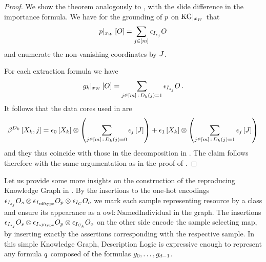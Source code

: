 \begin{proof}
    We show the theorem analogously to , with the slide difference in the importance formula.
    We have for the grounding of $p$ on $\mathrm{KG}|_{x_{W}}$ that
    \begin{align*}
        {p}|_{x_{W}}\left[O\right] = \sum_{j\in[m]}  \epsilon_{I_{s_j}}{O}
    \end{align*}
    and enumerate the non-vanishing coordinates by $J$.

    For each extraction formula we have
    \begin{align*}
        {g_{k}}|_{x_{W}}\left[O\right] = \sum_{j\in[m] \,:\, D_{k}(j)=1} \epsilon_{I_{s_j}}{O} \,.
    \end{align*}
    It follows that the data cores used in  are
    \begin{align*}
        \beta^{D_k}\left[X_{k},j\right]
        = \epsilon_{0}\left[X_{k}\right] \otimes \left(\sum_{j\in[m] \, : \, D_{k}(j)=0} \epsilon_{j}\left[J\right]\right)
        +\epsilon_{1}\left[X_{k}\right] \otimes \left(\sum_{j\in[m] \, : \, D_{k}(j)=1} \epsilon_{j}\left[J\right]\right)
    \end{align*}
    and they thus coincide with those in the decomposition in .
    The claim follows therefore with the same argumentation as in the proof of .
\end{proof}

%
Let us provide some more insights on the construction of the reproducing Knowledge Graph in .
By the insertions to the one-hot encodings $\epsilon_{I_{s_j}}{O_{s}} \otimes \epsilon_{I_{\mathrm{rdf}\mathrm{type}}}{O_{p}} \otimes \epsilon_{I_{C}}{O_{o}}$ we mark each sample representing resource by a class and ensure its appearance as a $\mathrm{owl:NamedIndividual}$ in the graph.
The insertions $\epsilon_{I_{s_j}}{O_{s}}\otimes \epsilon_{I_{\mathrm{rdf}\mathrm{type}}}{O_{p}} \otimes \epsilon_{I_{C_k}}{O_{o}}$ on the other side encode the sample selecting map, by inserting exactly the assertions corresponding with the respective sample.
% 
In this simple Knowledge Graph, Description Logic is expressive enough to represent any formula $q$ composed of the formulas $g_{0},\ldots,g_{d-1}$.

